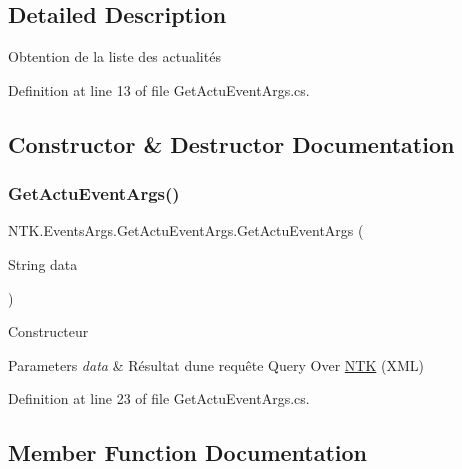 \subsection{Detailed Description}
Obtention de la liste des actualités 



Definition at line 13 of file Get\+Actu\+Event\+Args.\+cs.



\subsection{Constructor \& Destructor Documentation}
\mbox{\label{class_n_t_k_1_1_events_args_1_1_get_actu_event_args_af0122a3a973c3897b1eba4f0c10ddf11}} 
\subsubsection{\texorpdfstring{GetActuEventArgs()}{GetActuEventArgs()}}
{\footnotesize\ttfamily N\+T\+K.\+Events\+Args.\+Get\+Actu\+Event\+Args.\+Get\+Actu\+Event\+Args (\begin{DoxyParamCaption}\item[{String}]{data }\end{DoxyParamCaption})}



Constructeur 


\begin{DoxyParams}{Parameters}
{\em data} & Résultat d\textquotesingle{}une requête \textquotesingle{}Query Over \mbox{\hyperlink{namespace_n_t_k}{N\+TK}}\textquotesingle{} (X\+ML)\\
\hline
\end{DoxyParams}


Definition at line 23 of file Get\+Actu\+Event\+Args.\+cs.



\subsection{Member Function Documentation}
\mbox{\label{class_n_t_k_1_1_events_args_1_1_get_actu_event_args_a699190b100dbf162698e9bb82ce94e3b}} 
